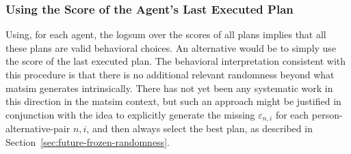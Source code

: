 %
%



\subsubsection{Using the Score of the Agent's Last Executed Plan}
\label{ch:economicEval:valuingBehavior:output2Eval:executed}
Using, for each agent, the logsum over the scores of all plans implies that all these plans are valid behavioral choices.  An alternative would be to simply use the score of the last executed plan.  The behavioral interpretation consistent with this procedure is that there is no additional relevant randomness beyond what \acrshort{matsim} generates intrinsically.  There has not yet been any systematic work in this direction in the \acrshort{matsim} context, but such an approach might be justified 
in conjunction 
with the idea to explicitly generate the missing $\varepsilon_{n,i}$ for each person-alternative-pair $n,i$, and then always select the best plan, as described in Section~\ref{sec:future-frozen-randomness}.



